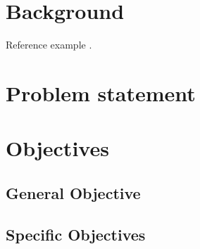 \section{Background}

Reference example \cite{Cormen2009}.

\section{Problem statement}


\section{Objectives}

\subsection{General Objective}



\subsection{Specific Objectives}





